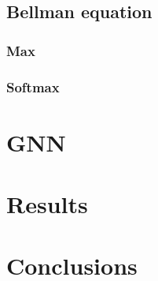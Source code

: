 \documentclass[a4paper,10pt]{report}
\begin{document}
\section{Bellman equation}
\subsection{Max}
\subsection{Softmax}

\chapter{GNN}

\chapter{Results}



\chapter{Conclusions}

\printbibliography
\end{document}
